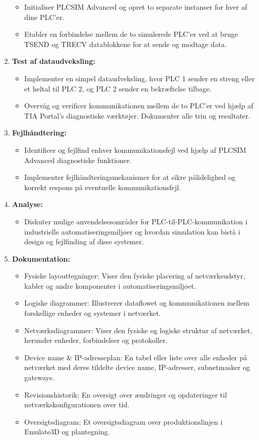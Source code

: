 \begin{enumerate}
\begin{itemize}
		\item Initialiser PLCSIM Advanced og opret to separate instanser for hver af dine PLC'er.
		\item Etabler en forbindelse mellem de to simulerede PLC'er ved at bruge TSEND og TRECV datablokkene for at sende og modtage data.
	\end{itemize}
	\item \textbf{Test af dataudveksling:}
	\begin{itemize}
		\item Implementer en simpel dataudveksling, hvor PLC 1 sender en streng eller et heltal til PLC 2, og PLC 2 sender en bekræftelse tilbage.
		\item Overvåg og verificer kommunikationen mellem de to PLC'er ved hjælp af TIA Portal's diagnostiske værktøjer. Dokumenter alle trin og resultater.
	\end{itemize}
	\item \textbf{Fejlhåndtering:}
	\begin{itemize}
		\item Identificer og fejlfind enhver kommunikationsfejl ved hjælp af PLCSIM Advanced diagnostiske funktioner.
		\item Implementer fejlhåndteringsmekanismer for at sikre pålidelighed og korrekt respons på eventuelle kommunikationsfejl.
	\end{itemize}
	\item \textbf{Analyse:}
	\begin{itemize}
		\item Diskuter mulige anvendelsesområder for PLC-til-PLC-kommunikation i industrielle automatiseringsmiljøer og hvordan simulation kan bistå i design og fejlfinding af disse systemer.
	\end{itemize}
	\item \textbf{Dokumentation:}
	\begin{itemize}
		\item Fysiske layouttegninger: Viser den fysiske placering af netværksudstyr, kabler og andre komponenter i automatiseringsmiljøet.
		\item Logiske diagrammer: Illustrerer dataflowet og kommunikationen mellem forskellige enheder og systemer i netværket.
		\item Netværksdiagrammer: Viser den fysiske og logiske struktur af netværket, herunder enheder, forbindelser og protokoller.
		\item Device name \& IP-adresseplan: En tabel eller liste over alle enheder på netværket med deres tildelte device name, IP-adresser, subnetmasker og gateways.
		\item Revisionshistorik: En oversigt over ændringer og opdateringer til netværkskonfigurationen over tid.
		\item Oversigtsdiagram: Et oversigtsdiagram over produktionslinjen i Emulate3D og plantegning.
	\end{itemize}
\end{enumerate}

